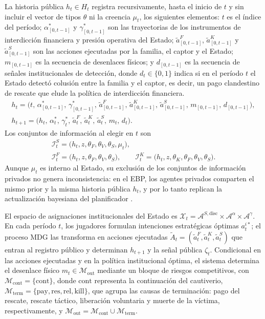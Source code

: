 \documentclass[pdflatex,sn-mathphys-ay]{sn-jnl}
\theoremstyle{thmstyleone}
\theoremstyle{thmstyletwo}
\theoremstyle{thmstylethree}
\newcommand{\1}{\mathbf{1}}
\begin{document}
La historia pública $h_t\in H_t$ registra recursivamente, hasta el inicio de $t$ y sin incluir el vector de tipos $\theta$ ni la creencia $\mu_t$, los siguientes elementos: $t$ es el índice del período; $\alpha^\ast_{[0,t-1]}$ y $\gamma^\ast_{[0,t-1]}$ son las trayectorias de los instrumentos de interdicción financiera y presión operativa del Estado; $\tilde{a}^F_{[0,t-1]}$, $\tilde{a}^K_{[0,t-1]}$ y $\tilde{a}^S_{[0,t-1]}$ son las acciones ejecutadas por la familia, el captor y el Estado; $m_{[0,t-1]}$ es la secuencia de desenlaces físicos; y $d_{[0,t-1]}$ es la secuencia de señales institucionales de detección, donde $d_t\in\{0,1\}$ indica si en el período $t$ el Estado detectó colusión entre la familia y el captor, es decir, un pago clandestino de rescate que elude la política de interdicción financiera.
\begin{gather}
h_t = \bigl(t,\,\alpha^\ast_{[0,t-1]},\,\gamma^\ast_{[0,t-1]},\,\tilde{a}^F_{[0,t-1]},\,\tilde{a}^K_{[0,t-1]},\,\tilde{a}^S_{[0,t-1]},\,m_{[0,t-1]},\,d_{[0,t-1]}\bigr),\label{eq:historia-publica}\\
h_{t+1} = \bigl(h_t,\,\alpha_t^\ast,\,\gamma_t^\ast,\,\tilde{a}_t^F,\,\tilde{a}_t^K,\,\tilde{a}_t^S,\,m_t,\,d_t\bigr).\label{eq:actualizacion-historia}
\end{gather}
Los conjuntos de información al elegir en $t$ son
\begin{gather*}
\mathcal{I}_t^S=\bigl(h_t,z,\theta_F,\theta_V,\theta_S,\mu_t\bigr),\\
\mathcal{I}_t^F=\bigl(h_t,z,\theta_F,\theta_V,\theta_S\bigr),\qquad
\mathcal{I}_t^K=\bigl(h_t,z,\theta_K,\theta_F,\theta_V,\theta_S\bigr).
\end{gather*}
Aunque $\mu_t$ es interno al Estado, su exclusión de los conjuntos de información privados no genera inconsistencia: en el EBP, los agentes privados comparten el mismo prior y la misma historia pública $h_t$, y por lo tanto replican la actualización bayesiana del planificador \citet{FudenbergTirole1991}.

El espacio de asignaciones institucionales del Estado es $\mathcal{X}_t=\mathcal{A}^{S,\mathrm{disc}}\times\mathcal{A}^{\alpha}\times\mathcal{A}^{\gamma}$. En cada período $t$, los jugadores formulan intenciones estratégicas óptimas $a_t^{i\ast}$; el proceso MDG las transforma en acciones ejecutadas $\tilde{A}_t=(\tilde{a}_t^F,\tilde{a}_t^K,\tilde{a}_t^S)$ que entran al registro público y determinan $h_{t+1}$ y la señal pública $\zeta_t$. Condicional en las acciones ejecutadas y en la política institucional óptima, el sistema determina el desenlace físico $m_t\in\mathcal{M}_{\mathrm{out}}$ mediante un bloque de riesgos competitivos, con $\mathcal{M}_{\mathrm{cont}}=\{\mathrm{cont}\}$, donde $\mathrm{cont}$ representa la continuación del cautiverio, $\mathcal{M}_{\mathrm{term}}=\{\mathrm{pay},\mathrm{res},\mathrm{rel},\mathrm{kill}\}$, que agrupa las causas de terminación: pago del rescate, rescate táctico, liberación voluntaria y muerte de la víctima, respectivamente, y $\mathcal{M}_{\mathrm{out}}=\mathcal{M}_{\mathrm{cont}}\cup\mathcal{M}_{\mathrm{term}}$.
\end{document}
